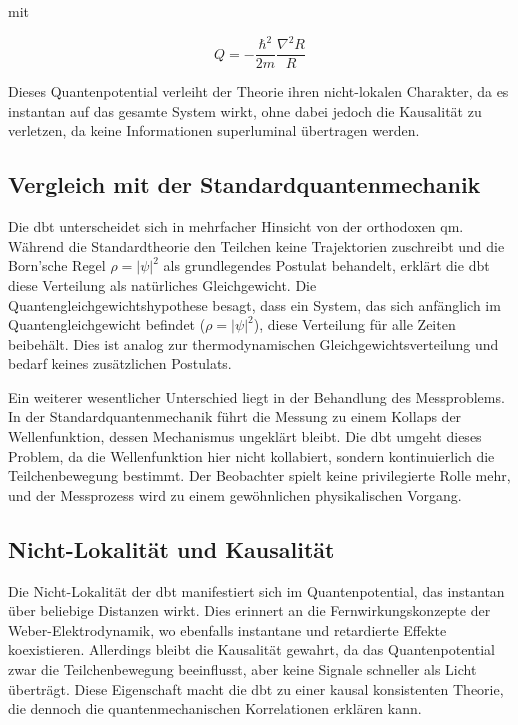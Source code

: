 mit

\begin{equation}
    Q = -\frac{\hbar^2}{2m} \frac{\nabla^2 R}{R}
\end{equation}

Dieses Quantenpotential verleiht der Theorie ihren nicht-lokalen Charakter, da es instantan auf das gesamte System wirkt, ohne dabei jedoch die Kausalität zu verletzen, da keine
Informationen superluminal übertragen werden.

\subsection{Vergleich mit der Standardquantenmechanik}
Die \gls{dbt} unterscheidet sich in mehrfacher Hinsicht von der orthodoxen \gls{qm}. Während die Standardtheorie den Teilchen keine Trajektorien zuschreibt und die
Born'sche Regel $\rho = \lvert \psi \rvert^{2}$ als grundlegendes Postulat behandelt, erklärt die \gls{dbt} diese Verteilung als natürliches Gleichgewicht. Die
Quantengleichgewichtshypothese besagt, dass ein System, das sich anfänglich im Quantengleichgewicht befindet ($\rho = \lvert \psi \rvert^{2}$), diese Verteilung für alle
Zeiten beibehält. Dies ist analog zur thermodynamischen Gleichgewichtsverteilung und bedarf keines zusätzlichen Postulats.

Ein weiterer wesentlicher Unterschied liegt in der Behandlung des Messproblems. In der Standardquantenmechanik führt die Messung zu einem Kollaps der Wellenfunktion, dessen
Mechanismus ungeklärt bleibt. Die \gls{dbt} umgeht dieses Problem, da die Wellenfunktion hier nicht kollabiert, sondern kontinuierlich die Teilchenbewegung bestimmt. Der Beobachter
spielt keine privilegierte Rolle mehr, und der Messprozess wird zu einem gewöhnlichen physikalischen Vorgang.

\subsection{Nicht-Lokalität und Kausalität}
Die Nicht-Lokalität der \gls{dbt} manifestiert sich im Quantenpotential, das instantan über beliebige Distanzen wirkt. Dies erinnert an die Fernwirkungskonzepte der Weber-Elektrodynamik,
wo ebenfalls instantane und retardierte Effekte koexistieren. Allerdings bleibt die Kausalität gewahrt, da das Quantenpotential zwar die Teilchenbewegung beeinflusst, aber keine Signale
schneller als Licht überträgt. Diese Eigenschaft macht die \gls{dbt} zu einer kausal konsistenten Theorie, die dennoch die quantenmechanischen Korrelationen erklären kann.

